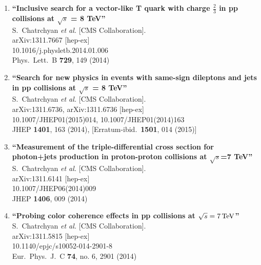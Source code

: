 \documentclass{article}
\begin{document}
\begin{enumerate}
\item%
{\bf ``Inclusive search for a vector-like T quark with charge $\frac{2}{3}$ in pp collisions at $\sqrt{s}$ = 8 TeV''}
  \\{}S.~Chatrchyan {\it et al.}  [CMS Collaboration].
  \\{}arXiv:1311.7667 [hep-ex]
    \\{}10.1016/j.physletb.2014.01.006
\\{}Phys.\ Lett.\ B {\bf 729}, 149 (2014) %


\item%
{\bf ``Search for new physics in events with same-sign dileptons and jets in pp collisions at $\sqrt{s}$ = 8 TeV''}
  \\{}S.~Chatrchyan {\it et al.}  [CMS Collaboration].
  \\{}arXiv:1311.6736, arXiv:1311.6736 [hep-ex]
    \\{}10.1007/JHEP01(2015)014, 10.1007/JHEP01(2014)163
\\{}JHEP {\bf 1401}, 163 (2014), [Erratum-ibid.\  {\bf 1501}, 014 (2015)] %


\item%
{\bf ``Measurement of the triple-differential cross section for photon+jets production in proton-proton collisions at $\sqrt{s}$=7 TeV''}
  \\{}S.~Chatrchyan {\it et al.}  [CMS Collaboration].
  \\{}arXiv:1311.6141 [hep-ex]
    \\{}10.1007/JHEP06(2014)009
\\{}JHEP {\bf 1406}, 009 (2014) %


\item%
{\bf ``Probing color coherence effects in pp collisions at $\sqrt{s}=7\,\rm  {TeV} $''}
  \\{}S.~Chatrchyan {\it et al.}  [CMS Collaboration].
  \\{}arXiv:1311.5815 [hep-ex]
    \\{}10.1140/epjc/s10052-014-2901-8
\\{}Eur.\ Phys.\ J.\ C {\bf 74}, no. 6, 2901 (2014) %



\end{enumerate}
\end{document}
